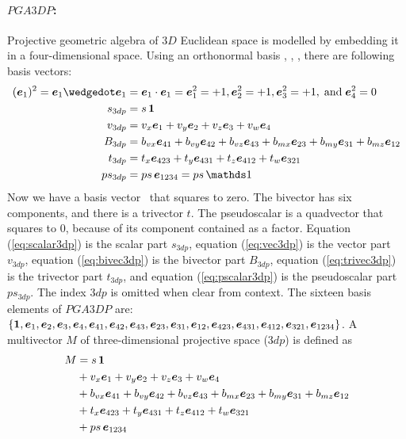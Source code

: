 \paragraph{$PGA3DP$:}
Projective geometric algebra of $3D$ Euclidean space is modelled by embedding it in a
four-dimensional space. Using an orthonormal basis , , ,  there
are following basis vectors:
\begin{subequations}
    \begin{align}
        (\bv{1})^2 = \bv{1} \wedgedot \bv1 & = \bv{1} \cdot \bv1 = \bv{1}^2 = +1,
        \bv{2}^2 = +1, \bv{3}^2 = +1,\;\text{and}\; \bv{4}^2 = 0 \nonumber\\ 
        s_{3dp} & = s \, \bm{1}
        \label{eq:scalar3dp} \\
        v_{3dp} & = v_x\bv{1} + v_y\bv{2} + v_z\bv{3} + v_w\bv{4} 
        \label{eq:vec3dp} \\ 
        B_{3dp} & = b_{vx}\bv{41} + b_{vy}\bv{42} + b_{vz}\bv{43} +
                    b_{mx}\bv{23} + b_{my}\bv{31} + b_{mz}\bv{12} 
        \label{eq:bivec3dp} \\ 
        t_{3dp} & = t_{x}\bv{423} + t_{y}\bv{431} + t_{z}\bv{412} + t_{w}\bv{321} 
        \label{eq:trivec3dp} \\ 
        ps_{3dp} & = ps \, \bv{1234}  = ps \, \ps
        \label{eq:pscalar3dp}
    \end{align}
\end{subequations}
Now we have a basis vector~ that squares to zero. The bivector has six components,
and there is a trivector $t$. The pseudoscalar  is a quadvector that squares to
$0$, because of its component  contained as a factor. Equation (\ref{eq:scalar3dp})
is the scalar part $s_{3dp}$, equation (\ref{eq:vec3dp}) is the vector part $v_{3dp}$,
equation (\ref{eq:bivec3dp}) is the bivector part $B_{3dp}$, equation (\ref{eq:trivec3dp})
is the trivector part $t_{3dp}$, and equation (\ref{eq:pscalar3dp}) is the pseudoscalar
part $ps_{3dp}$. The index $3dp$ is omitted when clear from context. The sixteen basis
elements of $PGA3DP$ are: $\{\bm{1}, \bm{e}_{1}, \bm{e}_{2}, \bm{e}_{3}, \bm{e}_{4}, \bm{e}_{41}, \bm{e}_{42},
\bm{e}_{43}, \bm{e}_{23}, \bm{e}_{31}, \bm{e}_{12}, \bm{e}_{423}, \bm{e}_{431}, \bm{e}_{412}, \bm{e}_{321}, \bm{e}_{1234}\}$.
A multivector $M$ of three-dimensional projective space ($3dp$) is defined as
\begin{equation}
    \begin{split}
    M & = s \, \bm{1} \\
      & + v_x\bm{e}_{1} + v_y\bm{e}_{2} + v_z\bm{e}_{3} + v_w\bm{e}_{4} \\
      & + b_{vx}\bm{e}_{41} + b_{vy}\bm{e}_{42} + b_{vz}\bm{e}_{43} 
        + b_{mx}\bm{e}_{23} + b_{my}\bm{e}_{31} + b_{mz}\bm{e}_{12} \\
      & + t_{x}\bm{e}_{423} + t_{y}\bm{e}_{431} + t_{z}\bm{e}_{412} + t_{w}\bm{e}_{321} \\
      & + ps \, \bm{e}_{1234}
    \label{eq:mvec3dp}
    \end{split}
\end{equation}
